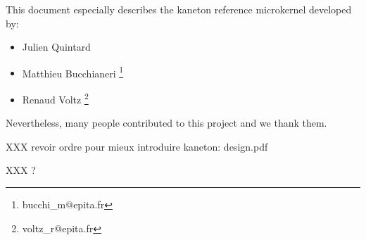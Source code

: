 This document especially describes the kaneton reference microkernel
developed by:

\begin{itemize}
  \item
    Julien Quintard
  \item
    Matthieu Bucchianeri \footnote{bucchi\_m@epita.fr}
  \item
    Renaud Voltz \footnote{voltz\_r@epita.fr}
\end{itemize}

Nevertheless, many people contributed to this project and we thank them.

%
%

\tableofcontents

%
%

XXX revoir ordre pour mieux introduire kaneton: design.pdf











%
%

XXX ?


